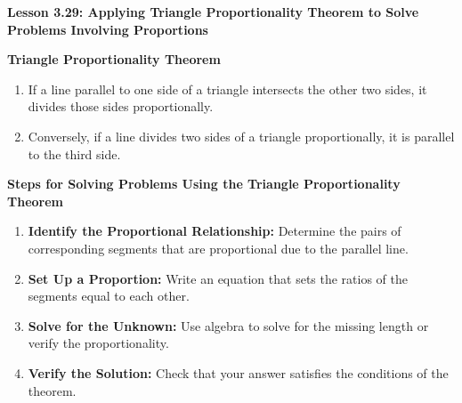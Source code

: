 \begin{center}
\textbf{Lesson 3.29: Applying Triangle Proportionality Theorem to Solve Problems Involving Proportions}
\end{center}

\vspace*{-1.5ex}

\noindent\textbf{Triangle Proportionality Theorem}
\begin{enumerate}[label=\color{blue}\arabic*.]
    \item If a line parallel to one side of a triangle intersects the other two sides, it divides those sides proportionally.
    \item Conversely, if a line divides two sides of a triangle proportionally, it is parallel to the third side.
\end{enumerate}

\noindent\textbf{Steps for Solving Problems Using the Triangle Proportionality Theorem}
\begin{enumerate}
    \item \textbf{Identify the Proportional Relationship:} Determine the pairs of corresponding segments that are proportional due to the parallel line.
    \item \textbf{Set Up a Proportion:} Write an equation that sets the ratios of the segments equal to each other.
    \item \textbf{Solve for the Unknown:} Use algebra to solve for the missing length or verify the proportionality.
    \item \textbf{Verify the Solution:} Check that your answer satisfies the conditions of the theorem.
\end{enumerate}
